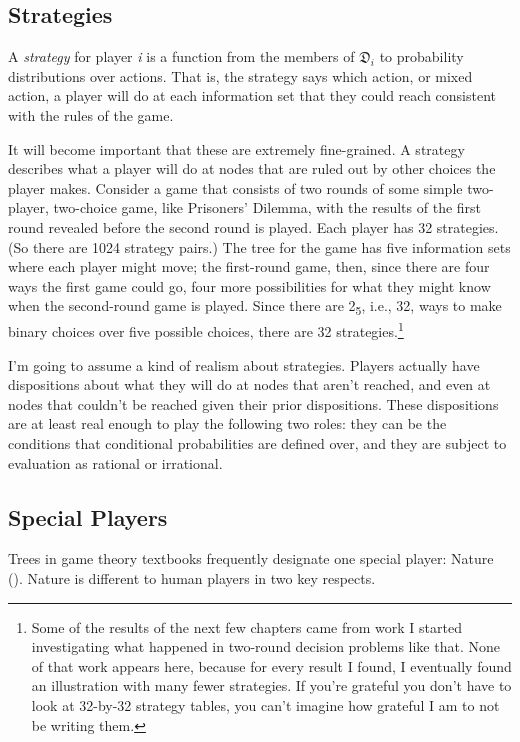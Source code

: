 \documentclass[
  12pt,
  letterpaper,
  DIV=11,
  numbers=noendperiod]{scrreprt}
\begin{document}
\subsection{Strategies}\label{sec-strategies}

A \emph{strategy} for player \emph{i} is a function from the members of
\(\mathfrak{D}_i\) to probability distributions over actions. That is,
the strategy says which action, or mixed action, a player will do at
each information set that they could reach consistent with the rules of
the game.

It will become important that these are extremely fine-grained. A
strategy describes what a player will do at nodes that are ruled out by
other choices the player makes. Consider a game that consists of two
rounds of some simple two-player, two-choice game, like Prisoners'
Dilemma, with the results of the first round revealed before the second
round is played. Each player has 32 strategies. (So there are 1024
strategy pairs.) The tree for the game has five information sets where
each player might move; the first-round game, then, since there are four
ways the first game could go, four more possibilities for what they
might know when the second-round game is played. Since there are
2\textsubscript{5}, i.e., 32, ways to make binary choices over five
possible choices, there are 32 strategies.\footnote{Some of the results
  of the next few chapters came from work I started investigating what
  happened in two-round decision problems like that. None of that work
  appears here, because for every result I found, I eventually found an
  illustration with many fewer strategies. If you're grateful you don't
  have to look at 32-by-32 strategy tables, you can't imagine how
  grateful I am to not be writing them.}

I'm going to assume a kind of realism about strategies. Players actually
have dispositions about what they will do at nodes that aren't reached,
and even at nodes that couldn't be reached given their prior
dispositions. These dispositions are at least real enough to play the
following two roles: they can be the conditions that conditional
probabilities are defined over, and they are subject to evaluation as
rational or irrational.

\subsection{Special Players}\label{sec-special-players}

Trees in game theory textbooks frequently designate one special player:
Nature (). Nature is
different to human players in two key respects.
\end{document}
